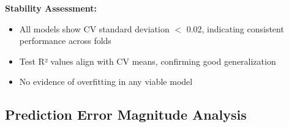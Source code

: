 


\textbf{Stability Assessment:}
\begin{itemize}
    \item All models show CV standard deviation $<$ 0.02, indicating consistent performance across folds
    \item Test R² values align with CV means, confirming good generalization
    \item No evidence of overfitting in any viable model
\end{itemize}


\subsection{Prediction Error Magnitude Analysis}

